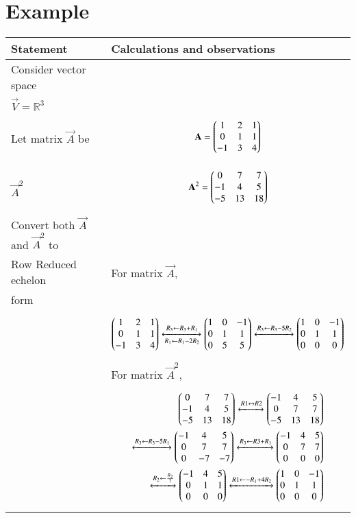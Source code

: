 \documentclass[journal,12pt]{IEEEtran}
\begin{document}
\section{\textbf{Example}}
\renewcommand{\thetable}{4}
\begin{longtable}{|l|l|}
\hline
\endhead
\textbf{Statement}&\textbf{Calculations and observations}\\
\hline
Consider vector space&\\$\vec{V}=\mathbb{R}^3$&\\
Let matrix $\vec{A}$ be&\parbox{12cm}{\begin{align}
    \mathbf{A}=\begin{pmatrix}1&2&1\\0&1&1\\-1&3&4\end{pmatrix}
\end{align}}\\
\hline$\vec{A}^2$&\parbox{12cm}{\begin{align}
    \mathbf{A}^2=\begin{pmatrix}0&7&7\\-1&4&5\\-5&13&18\end{pmatrix}
\end{align}}\\
\hline 
Convert both $\vec{A}$ and $\vec{A}^2$ to&\\Row Reduced echelon&For matrix $\vec{A}$,\\form&\\&\parbox{12cm}{\begin{align}
    \begin{pmatrix}1&2&1\\0&1&1\\-1&3&4\end{pmatrix}\xleftrightarrow[R_1\leftarrow R_1-2R_2]{R_3\leftarrow R_3+R_1}\begin{pmatrix}1&0&-1\\0&1&1\\0&5&5\end{pmatrix}\xleftrightarrow{R_3\leftarrow R_3-5R_2}\begin{pmatrix}1&0&-1\\0&1&1\\0&0&0\end{pmatrix}\label{Aref}
\end{align}}\\&For matrix $\vec{A}^2$,\\&\parbox{12cm}{\begin{align}
    \myvec{0&7&7\\-1&4&5\\-5&13&18}\xleftrightarrow[]{R1\leftrightarrow R2}\myvec{-1&4&5\\0&7&7\\-5&13&18}\\\xleftrightarrow[]{R_3\leftarrow R_3-5R_1}\myvec{-1&4&5\\0&7&7\\0&-7&-7}\xleftrightarrow[]{R_3\leftarrow R3+R_1}\myvec{-1&4&5\\0&7&7\\0&0&0}\\\xleftrightarrow[]{R_2\leftarrow\frac{R_2}{7}}\myvec{-1&4&5\\0&1&1\\0&0&0}\xleftrightarrow[]{R1\leftarrow -R_1+4R_2}\myvec{1&0&-1\\0&1&1\\0&0&0}\label{A2ref}

\end{align}}
\end{longtable}
\end{document}
